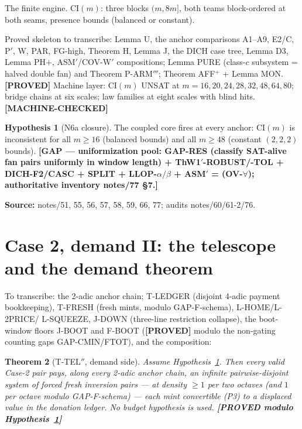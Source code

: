 \documentclass[11pt]{article}
\newtheorem{theorem}{Theorem}
\theoremstyle{definition}
\newtheorem{hypothesis}[theorem]{Hypothesis}
\newcommand{\CI}{\mathrm{CI}}
\newcommand{\source}[1]{\par\smallskip\noindent\textbf{Source:} {#1}\par}
\newcommand{\status}[1]{\textbf{[#1]}}
\begin{document}
The finite engine.  $\CI(m)$: three blocks $(m, 8m]$, both teams
block-ordered at both seams, presence bounds (balanced or constant).

Proved skeleton to transcribe: Lemma U, the anchor comparisons A1--A9,
E2/C, P$'$, W, PAR, FG-high, Theorem H, Lemma J, the DICH case tree, Lemma
D3, Lemma PH$+$, ASM$'$/COV-W$'$ compositions; Lemma PURE (class-$c$
subsystem = halved double fan) and Theorem P-ARM$'''$; Theorem AFF$^+$ +
Lemma MON.  \status{PROVED}  Machine layer: $\CI(m)$ UNSAT at
$m = 16, 20, 24, 28, 32, 48, 64, 80$; bridge chains at six scales; law
families at eight scales with blind hits.  \status{MACHINE-CHECKED}

\begin{hypothesis}[N6a closure]\label{hyp:n6a}
The coupled core fires at every anchor: $\CI(m)$ is inconsistent for all
$m \ge 16$ (balanced bounds) and all $m \ge 48$ (constant $(2,2,2)$
bounds).  \status{GAP --- uniformization pool: GAP-RES (classify SAT-alive
fan pairs uniformly in window length) + ThW1$'$-ROBUST/-TOL + DICH-F2/CASC
+ SPLIT + LLOP-$\alpha/\beta$ + ASM$'$ = (OV-$\forall$); authoritative
inventory notes/77 \S7.}
\end{hypothesis}

\source{notes/51, 55, 56, 57, 58, 59, 66, 77; audits notes/60/61-2/76.}

\section{Case 2, demand II: the telescope and the demand theorem}
\label{sec:telescope}

To transcribe: the 2-adic anchor chain; T-LEDGER (disjoint 4-adic payment
bookkeeping), T-FRESH (fresh mints, modulo GAP-F-schema), L-HOME/L-2PRICE/
L-SQUEEZE, J-DOWN (three-line restriction collapse), the boot-window floors
J-BOOT and F-BOOT (\status{PROVED} modulo the non-gating counting gaps
GAP-CMIN/FTOT), and the composition:

\begin{theorem}[T-TEL$''$, demand side]\label{thm:ttel}
Assume Hypothesis~\ref{hyp:n6a}.  Then every valid Case-2 pair pays, along
every 2-adic anchor chain, an infinite pairwise-disjoint system of forced
fresh inversion pairs --- at density $\ge 1$ per two octaves (and $1$ per
octave modulo GAP-F-schema) --- each mint convertible (P3) to a displaced
value in the donation ledger.  No budget hypothesis is used.
\status{PROVED modulo Hypothesis~\ref{hyp:n6a}}
\end{theorem}
\end{document}
